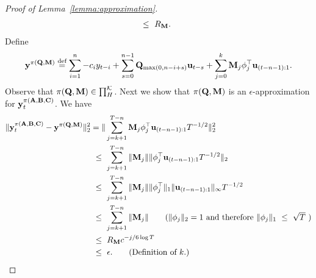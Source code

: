 \begin{proof}[Proof of Lemma~\ref{lemma:approximation}]
\begin{align*}
    & ~\le~ R_{\mathbf{M}}.
\end{align*}
Define
\begin{equation*}
    \mathbf{y}^{\pi(\mathbf{Q}, \mathbf{M})} \stackrel{\text{def}}{=} \sum_{i = 1}^n -c_i y_{t-i} + \sum_{s = 0}^{n-1} \mathbf{Q}_{\max(0, n-i+s)} \mathbf u_{t-s} + \sum_{j = 0}^{k} \mathbf{M}_j \phi_j^{\top} \mathbf u_{(t-n-1):1}.
\end{equation*}
Observe that $\pi(\mathbf{Q}, \mathbf{M}) \in \prod_{H}^{\mathcal{K}}$. Next we show that $\pi(\mathbf{Q}, \mathbf{M})$ is an $\epsilon$-approximation for $\mathbf{y}_t^{\pi(\mathbf{A}, \mathbf{B}, \mathbf{C})}$. We have
\begin{align*}
    \norm{ \y_t^{\pi(\A, \B, \C)} -  \y^{\pi(\Q, \M)}}_2^2 & = \norm{ \sum_{j = k+1}^{T-n} \M_j \phi_j^{\top} \uv_{(t-n-1):1}T^{-1/2}}_2^2 \\
    & \leq \sum_{j = k+1}^{T-n} \norm{ \M_j } \norm{\phi_j^{\top} \uv_{(t-n-1):1}T^{-1/2}}_2 \\
     & \leq \sum_{j = k+1}^{T-n} \norm{ \M_j } \norm{\phi_j^{\top}}_1 \norm{ \uv_{(t-n-1):1}}_{\infty} T^{-1/2} \\
     & \leq \sum_{j = k+1}^{T-n} \norm{ \M_j } \tag{$\norm{\phi_j}_2 = 1$ and therefore $\norm{\phi_j}_1 \leq \sqrt{T} $ } \\
      & \leq R_\M  c^{-j/6 \log T}  \\
      & \leq \epsilon. \tag{Definition of $k$.} 
\end{align*}
\end{proof}

